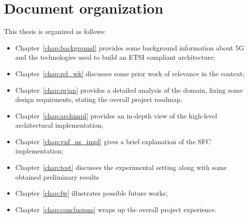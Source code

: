 \section*{Document organization}
 
This thesis is organized as follows:
\begin{itemize}
 \item Chapter~\ref{chap:background} provides some background information about
   5G and the technologies used to build an ETSI compliant architecture;
 \item Chapter~\ref{chap:rel_wk} discusses some prior work of relevance in the
   context;
 \item Chapter~\ref{chap:prjan} provides a detailed analysis of the domain,
   fixing some design requirments, stating the overall project roadmap.
 \item Chapter~\ref{chap:archimpl} provides an in-depth view of the high-level
   architectural implementation;
 \item Chapter~\ref{chap:vnf_ns_impl} gives a brief explanation of the SFC
   implementation;
 \item Chapter~\ref{chap:test} discusses the experimental setting along with
   some obtained preliminary results
 \item Chapter~\ref{chap:fw} illustrates possible future works;
 \item Chapter~\ref{chap:conclusions} wraps up the overall project experience.
\end{itemize}
